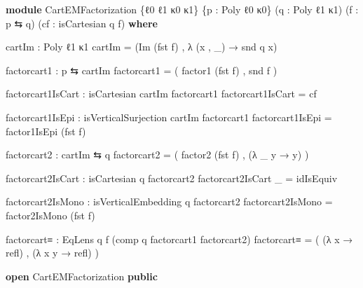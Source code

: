 \documentclass[
  11pt,
  oneside,
  article]{memoir}
\newenvironment{Shaded}{}{}
\newcommand{\KeywordTok}[1]{\textcolor[rgb]{0.00,0.44,0.13}{\textbf{#1}}}
\newcommand{\NormalTok}[1]{#1}
\newcommand{\OtherTok}[1]{\textcolor[rgb]{0.00,0.44,0.13}{#1}}
\theoremstyle{definition}
\theoremstyle{plain}
\newcommand{\0}{\textsf{0}}
\newcommand{\1}{\tn{\textsf{1}}}
\begin{document}
\begin{Shaded}
\begin{Highlighting}[]
\KeywordTok{module}\NormalTok{ CartEMFactorization }\OtherTok{\{}\NormalTok{ℓ0 ℓ1 κ0 κ1}\OtherTok{\}} \OtherTok{\{}\NormalTok{p }\OtherTok{:}\NormalTok{ Poly ℓ0 κ0}\OtherTok{\}} 
           \OtherTok{(}\NormalTok{q }\OtherTok{:}\NormalTok{ Poly ℓ1 κ1}\OtherTok{)} \OtherTok{(}\NormalTok{f }\OtherTok{:}\NormalTok{ p ⇆ q}\OtherTok{)} \OtherTok{(}\NormalTok{cf }\OtherTok{:}\NormalTok{ isCartesian q f}\OtherTok{)} \KeywordTok{where}

\NormalTok{    cartIm }\OtherTok{:}\NormalTok{ Poly ℓ1 κ1}
\NormalTok{    cartIm }\OtherTok{=} \OtherTok{(}\NormalTok{Im }\OtherTok{(}\NormalTok{fst f}\OtherTok{)}\NormalTok{ , }\OtherTok{λ} \OtherTok{(}\NormalTok{x , }\OtherTok{\_)} \OtherTok{→}\NormalTok{ snd q x}\OtherTok{)}

\NormalTok{    factorcart1 }\OtherTok{:}\NormalTok{ p ⇆ cartIm}
\NormalTok{    factorcart1 }\OtherTok{=} \OtherTok{(}\NormalTok{ factor1 }\OtherTok{(}\NormalTok{fst f}\OtherTok{)}\NormalTok{ , snd f }\OtherTok{)}

\NormalTok{    factorcart1IsCart }\OtherTok{:}\NormalTok{ isCartesian cartIm factorcart1}
\NormalTok{    factorcart1IsCart }\OtherTok{=}\NormalTok{ cf}

\NormalTok{    factorcart1IsEpi }\OtherTok{:}\NormalTok{ isVerticalSurjection cartIm factorcart1}
\NormalTok{    factorcart1IsEpi }\OtherTok{=}\NormalTok{ factor1IsEpi }\OtherTok{(}\NormalTok{fst f}\OtherTok{)}

\NormalTok{    factorcart2 }\OtherTok{:}\NormalTok{ cartIm ⇆ q}
\NormalTok{    factorcart2 }\OtherTok{=} \OtherTok{(}\NormalTok{ factor2 }\OtherTok{(}\NormalTok{fst f}\OtherTok{)}\NormalTok{ , }\OtherTok{(λ} \OtherTok{\_}\NormalTok{ y }\OtherTok{→}\NormalTok{ y}\OtherTok{)} \OtherTok{)}

\NormalTok{    factorcart2IsCart }\OtherTok{:}\NormalTok{ isCartesian q factorcart2}
\NormalTok{    factorcart2IsCart }\OtherTok{\_} \OtherTok{=}\NormalTok{ idIsEquiv}

\NormalTok{    factorcart2IsMono }\OtherTok{:}\NormalTok{ isVerticalEmbedding q factorcart2}
\NormalTok{    factorcart2IsMono }\OtherTok{=}\NormalTok{ factor2IsMono }\OtherTok{(}\NormalTok{fst f}\OtherTok{)}

\NormalTok{    factorcart≡ }\OtherTok{:}\NormalTok{ EqLens q f }\OtherTok{(}\NormalTok{comp q factorcart1 factorcart2}\OtherTok{)}
\NormalTok{    factorcart≡ }\OtherTok{=} \OtherTok{(} \OtherTok{(λ}\NormalTok{ x }\OtherTok{→}\NormalTok{  refl}\OtherTok{)}\NormalTok{ , }\OtherTok{(λ}\NormalTok{ x y }\OtherTok{→}\NormalTok{ refl}\OtherTok{)} \OtherTok{)}

\KeywordTok{open}\NormalTok{ CartEMFactorization }\KeywordTok{public}
\end{Highlighting}
\end{Shaded}
\end{document}
